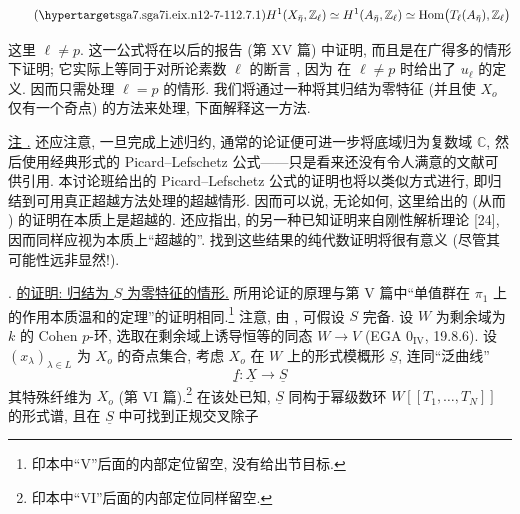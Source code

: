 \begin{equation}\tag{\SGARefTarget{sga7.sga7i.eix.n12-7-1}{12.7.1}}
 H^1(X_{\bar\eta},\mathbb Z_\ell)
 \simeq H^1(A_{\bar\eta},\mathbb Z_\ell)
 \simeq\operatorname{Hom}
   \bigl(T_\ell(A_{\bar\eta}),\mathbb Z_\ell\bigr)
\end{equation}

\noindent
这里 $\ell\ne p$. 这一公式将在以后的报告 (第 XV 篇) 中证明, 而且是在广得多的情形下证明; 它实际上等同于对所论素数 $\ell$ 的断言 , 因为  在 $\ell\ne p$ 时给出了 $u_\ell$ 的定义. 因而只需处理 $\ell=p$ 的情形. 我们将通过一种将其归结为零特征 (并且使 $X_o$ 仅有一个奇点) 的方法来处理, 下面解释这一方法.

\medskip
\noindent
\underline{注 .} 还应注意, 一旦完成上述归约, 通常的论证便可进一步将底域归为复数域 $\mathbb C$, 然后使用经典形式的 Picard--Lefschetz 公式——只是看来还没有令人满意的文献可供引用. 本讨论班给出的 Picard--Lefschetz 公式的证明也将以类似方式进行, 即归结到可用真正超越方法处理的超越情形. 因而可以说, 无论如何, 这里给出的  (从而 ) 的证明在本质上是超越的. 还应指出,  的另一种已知证明来自刚性解析理论 [24], 因而同样应视为本质上“超越的”. 找到这些结果的纯代数证明将很有意义 (尽管其可能性远非显然!).


\medskip
\noindent
{}. \underline{ 的证明: 归结为 $S$ 为零特征的情形.} 所用论证的原理与第 V 篇中“单值群在 $\pi_1$ 上的作用本质温和的定理”的证明相同.\footnote{印本中“V”后面的内部定位留空, 没有给出节目标.} 注意, 由 , 可假设 $S$ 完备. 设 $W$ 为剩余域为 $k$ 的 Cohen $p$-环, 选取在剩余域上诱导恒等的同态 $W\longrightarrow V$ (EGA $0_{\mathrm{IV}}$, 19.8.6). 设 $(x_\lambda)_{\lambda\in L}$ 为 $X_o$ 的奇点集合, 考虑 $X_o$ 在 $W$ 上的形式模概形 $\underline S$, 连同“泛曲线”
\[
 \underline f:\underline X\longrightarrow\underline S
\]
其特殊纤维为 $X_o$ (第 VI 篇).\footnote{印本中“VI”后面的内部定位同样留空.} 在该处已知, $\underline S$ 同构于幂级数环 $W[[T_1,\ldots,T_N]]$ 的形式谱, 且在 $\underline S$ 中可找到正规交叉除子

